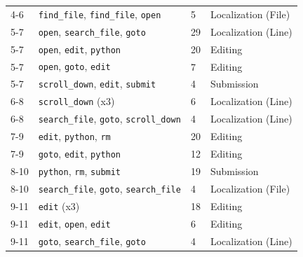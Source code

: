 \begin{table}
\begin{tabular}{llll}
4-6 & \texttt{find\_file}, \texttt{find\_file}, \texttt{open} & 5 & Localization (File) \\
5-7 & \texttt{open}, \texttt{search\_file}, \texttt{goto} & 29 & Localization (Line) \\
5-7 & \texttt{open}, \texttt{edit}, \texttt{python} & 20 & Editing \\
5-7 & \texttt{open}, \texttt{goto}, \texttt{edit} & 7 & Editing \\
5-7 & \texttt{scroll\_down}, \texttt{edit}, \texttt{submit} & 4 & Submission \\
6-8 & \texttt{scroll\_down} (x3) & 6 & Localization (Line) \\
6-8 & \texttt{search\_file}, \texttt{goto}, \texttt{scroll\_down} & 4 & Localization (Line) \\
7-9 & \texttt{edit}, \texttt{python}, \texttt{rm} & 20 & Editing \\
7-9 & \texttt{goto}, \texttt{edit}, \texttt{python} & 12 & Editing \\
8-10 & \texttt{python}, \texttt{rm}, \texttt{submit} & 19 & Submission \\
8-10 & \texttt{search\_file}, \texttt{goto}, \texttt{search\_file} & 4 & Localization (File) \\
9-11 & \texttt{edit} (x3) & 18 & Editing \\
9-11 & \texttt{edit}, \texttt{open}, \texttt{edit} & 6 & Editing \\
9-11 & \texttt{goto}, \texttt{search\_file}, \texttt{goto} & 4 & Localization (Line) \\
\bottomrule
    \end{tabular}
\end{table}